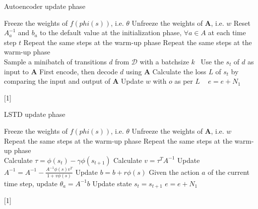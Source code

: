 \documentclass[a4paper,12pt,oneside]{article}
\numberwithin{equation}{section}
\begin{document}
    \clearpage
    \begin{algorithm}
    \caption{Autoencoder update phase}
        \begin{algorithmic}[1]
            \State Freeze the weights of \(f(phi(s))\), i.e. $\theta$
            \State Unfreeze the weights of $\mathbf{A}$, i.e. \(w\)
            \State Reset \(A_a^{-1}\) and \(b_a\) to the default value at the initialization phase, $\forall a \in A$ at each time step $t$
            \State Repeat the same steps at the warm-up phase
                \State Repeat the same steps at the warm-up phase
                \\
                \State Sample a minibatch of transitions \(d\) from $\mathcal{D}$ with a batchsize \(k\) \
                \State Use the \(s_t\) of \(d\) as input to $\mathbf{A}$
                \State First encode, then decode \(d\) using $\mathbf{A}$
                \State Calculate the loss \(L\) of \(s_t\) by comparing the input and output of $\mathbf{A}$
                \State Update \(w\) with \(o\) as per \(L\)
                \
            \EndFor
        \EndFor
        \State $e=e+N_1$
        \end{algorithmic}[1]
    \end{algorithm}

    \clearpage
    \begin{algorithm}
    \caption{LSTD update phase}
        \begin{algorithmic}[1]
            \State Freeze the weights of \(f(phi(s))\), i.e. $\theta$
            \State Unfreeze the weights of $\mathbf{A}$, i.e. \(w\)
        \For {\(episode\) \(e_0 = 1\) to \(N_1\)}
            \State Repeat the same steps at the warm-up phase
                \State Repeat the same steps at the warm-up phase
                \\
                \State Calculate $\tau = \phi(s_t) - \gamma \phi(s_{t+1})$
                \State Calculate $v = \tau^{T} A^{-1}$
                \State Update $A^{-1} = A^{-1} - \frac{A^{-1} \phi(s) v^{T}}{1 + v \phi(s)}$
                \State Update $b = b + r \phi(s)$
                \State Given the action $a$ of the current time step, update $\theta_a = A^{-1} b $
                \State Update state $s_t=s_{t+1}$
            \EndFor
        \EndFor
        \State $e=e+N_1$
        \end{algorithmic}[1]    
    \end{algorithm}
\end{document}
